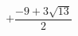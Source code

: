 \documentclass[preview]{standalone}
\begin{document}
\begin{align*}
+ \dfrac{-9 + 3\sqrt{13} }{2}
\end{align*}
\end{document}
